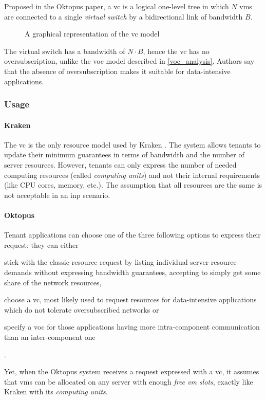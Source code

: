 
Proposed in the Oktopus \cite{oktopus} paper, a \gls{vc} is a logical one-level tree in which $N$ \glspl{vm} are connected to a single \textit{virtual switch} by a bidirectional link of bandwidth $B$.

\begin{figure}[!htb]
    \centering
    \usebox{\vcfigure}
    \caption{A graphical representation of the \gls{vc} model}
\end{figure}

The virtual switch has a bandwidth of $N \cdot B$, hence the \gls{vc} has no oversubscription, unlike the \gls{voc} model described in \autoref{voc_analysis}.
Authors say that the absence of oversubscription makes it suitable for data-intensive applications.

\subsubsection{Usage}
\paragraph{Kraken \texorpdfstring{\cite{kraken}}{}}
The \gls{vc} is the only resource model used by Kraken \cite{kraken}.
The system allows tenants to update their minimum guarantees in terms of bandwidth and the number of server resources.
However, tenants can only express the number of needed computing resources (called \textit{computing units}) and not their internal requirements (like CPU cores, memory, etc.).
The assumption that all resources are the same is not acceptable in an \gls{inp} scenario.

\paragraph{Oktopus \texorpdfstring{\cite{oktopus}}{}}
Tenant applications can choose one of the three following options to express their request: they can either
\begin{mylist}
    \item stick with the classic resource request by listing individual server resource demands without expressing bandwidth guarantees, accepting to simply get some share of the network resources,
    \item choose a \gls{vc}, most likely used to request resources for data-intensive applications which do not tolerate oversubscribed networks or
    \item specify a \gls{voc} for those applications having more intra-component communication than an inter-component one
\end{mylist}.\par
Yet, when the Oktopus \cite{oktopus} system receives a request expressed with a \gls{vc}, it assumes that \glspl{vm} can be allocated on any server with enough \textit{free \gls{vm} slots}, exactly like Kraken \cite{kraken} with its \textit{computing units}.